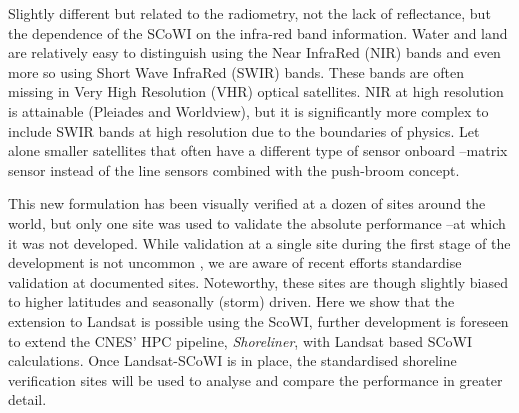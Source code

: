 \documentclass[remotesensing,technicalnote,submit,pdftex,moreauthors]{Definitions/mdpi}
\begin{document}
Slightly different but related to the radiometry, not the lack of reflectance, but the dependence of the SCoWI on the infra-red band information. Water and land are relatively easy to distinguish using the Near InfraRed (NIR) bands and even more so using Short Wave InfraRed (SWIR) bands. These bands are often missing in Very High Resolution (VHR) optical satellites. NIR at high resolution is attainable (Pleiades and Worldview), but it is significantly more complex to include SWIR bands at high resolution due to the boundaries of physics. Let alone smaller satellites that often have a different type of sensor onboard --matrix sensor instead of the line sensors combined with the push-broom concept. 

This new formulation has been visually verified at a dozen of sites around the world, but only one site was used to validate the absolute performance --at which it was not developed. While validation at a single site during the first stage of the development is not uncommon \citep{VOS2019_google,CASTELLE2021107707}, we are aware of recent efforts standardise validation at documented sites. Noteworthy, these sites are though slightly biased to higher latitudes and seasonally (storm) driven. Here we show that the extension to Landsat is possible using the ScoWI, further development is foreseen to extend the CNES' HPC pipeline, \textit{Shoreliner}, with Landsat based SCoWI calculations. Once Landsat-SCoWI is in place, the standardised shoreline verification sites will be used to analyse and compare the performance in greater detail. 
\end{document}
